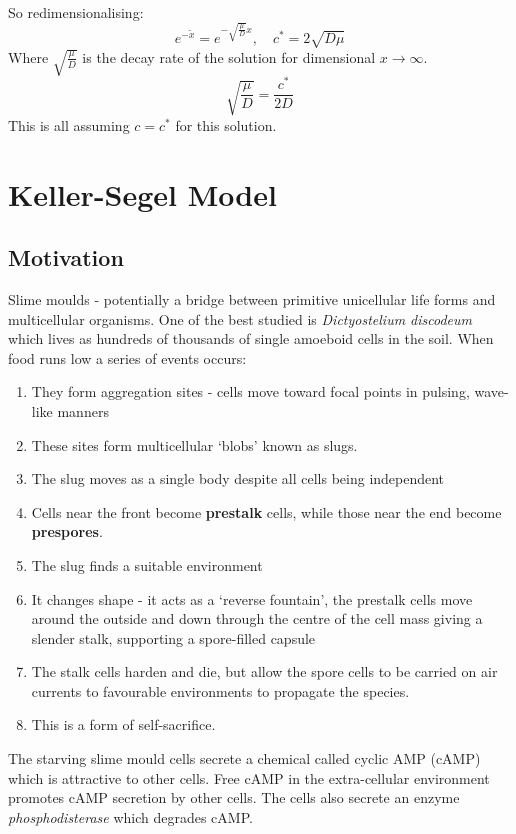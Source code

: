 \documentclass{X:/Documents/Coding/Latex/myassignment}
\begin{document}
So redimensionalising:
\[e^{-\tilde x} = e^{-\sqrt{\frac{\mu}{D}} x}, \quad c^* = 2 \sqrt{D\mu}\]
Where $\sqrt{\frac{\mu}{D}}$ is the decay rate of the solution for dimensional $x \to \infty$.
\[\sqrt{\frac{\mu}{D}} = \frac{c^*}{2D} \]
This is all assuming $c = c^*$ for this solution.


\section{Keller-Segel Model}
\subsection{Motivation}
Slime moulds - potentially a bridge between primitive unicellular life forms and multicellular organisms. One of the best studied is \textit{Dictyostelium discodeum} which lives as hundreds of thousands of single amoeboid cells in the soil. When food runs low a series of events occurs:
\begin{enumerate}
	\item They form aggregation sites - cells move toward focal points in pulsing, wave-like manners
	\item These sites form multicellular `blobs' known as slugs.
	\item The slug moves as a single body despite all cells being independent
	\item Cells near the front become \textbf{prestalk} cells, while those near the end become \textbf{prespores}.
	\item The slug finds a suitable environment 
	\item It changes shape - it acts as a `reverse fountain', the prestalk cells move around the outside and down through the centre of the cell mass giving a slender stalk, supporting a spore-filled capsule
	\item The stalk cells harden and die, but allow the spore cells to be carried on air currents to favourable environments to propagate the species.
	\item This is a form of self-sacrifice.
\end{enumerate}

The starving slime mould cells secrete a chemical called cyclic AMP (cAMP) which is attractive to other cells. Free cAMP in the extra-cellular environment promotes cAMP secretion by other cells. The cells also secrete an enzyme \textit{phosphodisterase} which degrades cAMP. 
\end{document}
